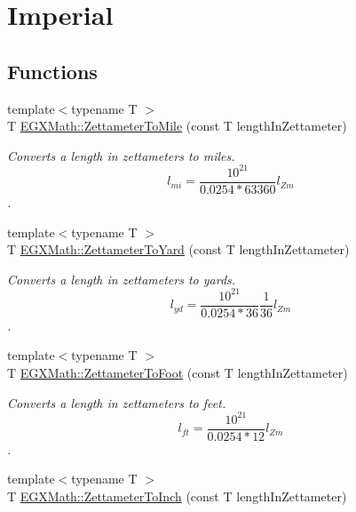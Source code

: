 \hypertarget{group___e_g_x_math-_conversions-_length_conversions-_s_i-_zettameter-_imperial}{}\section{Imperial}
\label{group___e_g_x_math-_conversions-_length_conversions-_s_i-_zettameter-_imperial}
\subsection*{Functions}
\begin{DoxyCompactItemize}
\item 
{\footnotesize template$<$typename T $>$ }\\T \mbox{\hyperlink{group___e_g_x_math-_conversions-_length_conversions-_s_i-_zettameter-_imperial_ga217b12dd9c920150cbcf50413e98dd47}{E\+G\+X\+Math\+::\+Zettameter\+To\+Mile}} (const T length\+In\+Zettameter)
\begin{DoxyCompactList}\small\item\em Converts a length in zettameters to miles. \[ l_{mi}=\frac{10^{21}}{0.0254 * 63360} l_{Zm} \]. \end{DoxyCompactList}\item 
{\footnotesize template$<$typename T $>$ }\\T \mbox{\hyperlink{group___e_g_x_math-_conversions-_length_conversions-_s_i-_zettameter-_imperial_gaf0f61cf5764afa5022579c2e638a0c2e}{E\+G\+X\+Math\+::\+Zettameter\+To\+Yard}} (const T length\+In\+Zettameter)
\begin{DoxyCompactList}\small\item\em Converts a length in zettameters to yards. \[ l_{yd}= \frac{10^{21}}{0.0254 * 36} \frac{1}{36} l_{Zm} \]. \end{DoxyCompactList}\item 
{\footnotesize template$<$typename T $>$ }\\T \mbox{\hyperlink{group___e_g_x_math-_conversions-_length_conversions-_s_i-_zettameter-_imperial_ga2b64ad3efd85a1800a76661d05487a09}{E\+G\+X\+Math\+::\+Zettameter\+To\+Foot}} (const T length\+In\+Zettameter)
\begin{DoxyCompactList}\small\item\em Converts a length in zettameters to feet. \[ l_{ft}= \frac{10^{21}}{0.0254 * 12} l_{Zm} \]. \end{DoxyCompactList}\item 
{\footnotesize template$<$typename T $>$ }\\T \mbox{\hyperlink{group___e_g_x_math-_conversions-_length_conversions-_s_i-_zettameter-_imperial_gada0a88ddbf198ca1828b6c39fda34f2c}{E\+G\+X\+Math\+::\+Zettameter\+To\+Inch}} (const T length\+In\+Zettameter)

\end{DoxyCompactItemize}

